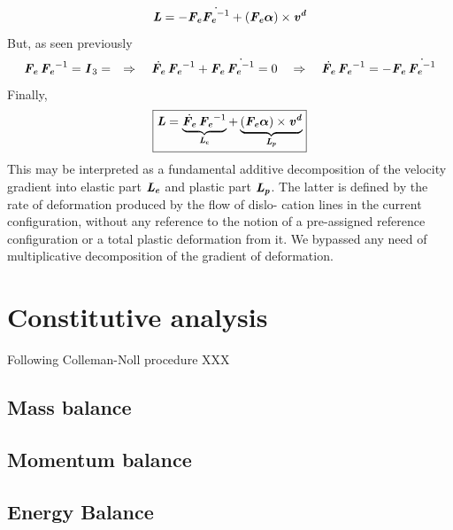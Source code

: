 \documentclass{article}
\begin{document}
\begin{equation}
    \bm{\mathit{L}}=- \bm{\mathit{F_e}} \dot{\bm{\mathit{F_e}}^{-1}} + (\bm{\mathit{F_e}}\bm{\mathit{\alpha}})\times \bm{\mathit{v^d}}
\end{equation}
But, as seen previously
\begin{equation}
    \bm{\mathit{F_e}}\,\bm{\mathit{F_e}}^{-1} = \bm{\mathit{I}}_3 = \quad \Rightarrow \quad \dot{\bm{\mathit{F_e}}}\,\bm{\mathit{F_e}}^{-1}+ \bm{\mathit{F_e}}\,\dot{\bm{\mathit{F_e}}^{-1}}=0 \quad \Rightarrow \quad \dot{\bm{\mathit{F_e}}}\,\bm{\mathit{F_e}}^{-1}=- \bm{\mathit{F_e}}\,\dot{\bm{\mathit{F_e}}^{-1}}
\end{equation}
Finally,
\begin{equation}
    \boxed{
        \bm{\mathit{L}}=\underbrace{\dot{\bm{\mathit{F_e}}}\,\bm{\mathit{F_e}}^{-1}}_{\bm{\mathit{L_e}}} + \underbrace{(\bm{\mathit{F_e}}\bm{\mathit{\alpha}})\times \bm{\mathit{v^d}}}_{\bm{\mathit{L_p}}}
    }
\end{equation}
This may be interpreted as a fundamental additive decomposition of
the velocity gradient into elastic part $\bm{\mathit{L_e}}$ and plastic part $\bm{\mathit{L_p}}$.
The latter is defined by the rate of deformation produced by the flow of dislo-
cation lines in the current configuration, without any reference to the notion of
a pre-assigned reference configuration or a total plastic deformation from it. We bypassed any need of multiplicative decomposition of the gradient of deformation.
\section{Constitutive analysis}
Following Colleman-Noll procedure XXX
\subsection{Mass balance}
\subsection{Momentum balance}
\subsection{Energy Balance}
\end{document}
